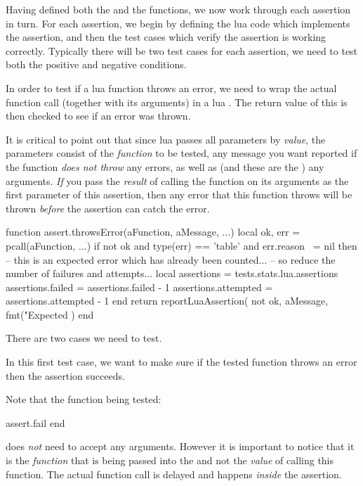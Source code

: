 Having defined both the  and the  
functions, we now work through each assertion in turn. For each assertion, 
we begin by defining the lua code which implements the assertion, and then 
the test cases which verify the assertion is working correctly. Typically 
there will be two test cases for each assertion, we need to test both the 
positive and negative conditions. 


In order to test if a lua function throws an error, we need to wrap the 
actual function call (together with its arguments) in a lua . 
The return value of this  is then checked to see if an error 
was thrown. 

It is critical to point out that since lua passes all parameters by 
\emph{value}, the  parameters consist of the 
\emph{function} to be tested, any message you want reported if the 
function \emph{does not throw} any errors, as well as (and these are the 
) any arguments. \emph{If} you pass the \emph{result} of 
calling the function on its arguments as the first parameter of this 
assertion, then any error that this function throws will be thrown 
\emph{before} the assertion can catch the error. 

\startLuaCode
function assert.throwsError(aFunction, aMessage, ...)
  local ok, err = pcall(aFunction, ...)
  if not ok and type(err) == 'table' and err.reason ~= nil then 
    -- this is an expected error which has already been counted...
    -- so reduce the number of failures and attempts...
    local assertions = tests.stats.lua.assertions
    assertions.failed    = assertions.failed    - 1
    assertions.attempted = assertions.attempted - 1
  end
  return reportLuaAssertion(
    not ok,
    aMessage,
    fmt("Expected %
  )
end
\stopLuaCode

There are two cases we need to test.


In this first test case, we want to make sure if the tested function 
throws an error then the assertion succeeds.

Note that the function being tested: 

\starttyping[option=lua]
  assert.fail
end
\stoptyping

\noindent does \emph{not} need to accept any arguments. However it is 
important to notice that it is the \emph{function} that is being passed 
into the  and not the \emph{value} of calling 
this function. The actual function call is delayed and happens 
\emph{inside} the assertion. 

